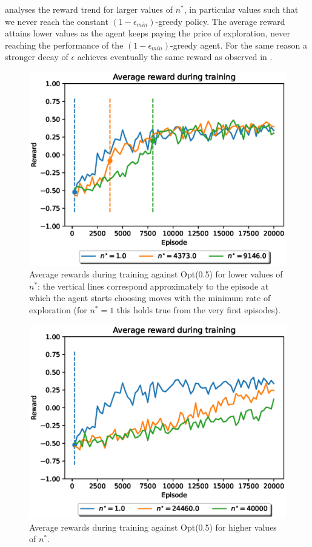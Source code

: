 \documentclass[10pt]{IEEEtran}
\begin{document}
 analyses the reward trend for larger values of $n^{*}$, in particular values such that we never reach the constant $(1-\epsilon_{min})$-greedy policy. The average reward attains lower values as the agent keeps paying the price of exploration, never reaching the performance of the $(1-\epsilon_{min})$-greedy agent. For the same reason a stronger decay of $\epsilon$ achieves eventually the same reward as observed in .

\begin{figure}[H]
    \centering
    \includegraphics[width = 0.85\linewidth]{code/figures/rewards_n_star_second.eps}
    \caption{Average rewards during training against Opt(0.5) for lower values of $n^{*}$: the vertical lines correspond approximately to the episode at which the agent starts choosing moves with the minimum rate of exploration (for $n^{*} = 1$ this holds true from the very first episodes).}
    \label{firstplot_question2}
\end{figure}

\begin{figure}[H]
    \centering
    \includegraphics[width = 0.85\linewidth]{code/figures/rewards_n_star_first.eps}
    \caption{Average rewards during training against Opt(0.5) for higher values of $n^{*}$.}
    \label{secondplot_question2}
\end{figure}
\end{document}
